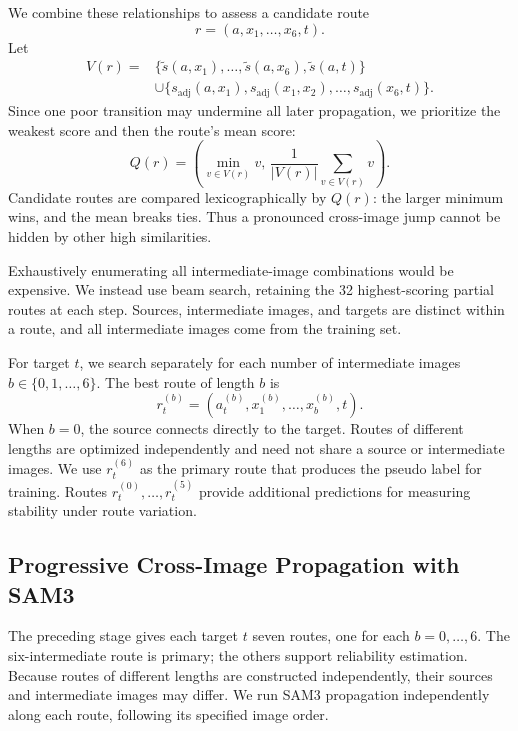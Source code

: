 \documentclass[a4paper,fleqn]{cas-dc}
\begin{document}
We combine these relationships to assess a candidate route
\begin{equation}
r=(a,x_1,\ldots,x_6,t).
\end{equation}
Let
\begin{equation}
\begin{aligned}
V(r)=&\{\widetilde{s}(a,x_1),\ldots,
\widetilde{s}(a,x_6),\widetilde{s}(a,t)\}\\
&\cup\{s_{\mathrm{adj}}(a,x_1),
s_{\mathrm{adj}}(x_1,x_2),\ldots,
s_{\mathrm{adj}}(x_6,t)\}.
\end{aligned}
\end{equation}
Since one poor transition may undermine all later propagation, we prioritize the weakest score and then the route's mean score:
\begin{equation}
Q(r)=\left(
\min_{v\in V(r)}v,\,
\frac{1}{|V(r)|}\sum_{v\in V(r)}v
\right).
\end{equation}
Candidate routes are compared lexicographically by $Q(r)$: the larger minimum wins, and the mean breaks ties. Thus a pronounced cross-image jump cannot be hidden by other high similarities.

Exhaustively enumerating all intermediate-image combinations would be expensive. We instead use beam search, retaining the 32 highest-scoring partial routes at each step. Sources, intermediate images, and targets are distinct within a route, and all intermediate images come from the training set.

For target $t$, we search separately for each number of intermediate images $b\in\{0,1,\ldots,6\}$. The best route of length $b$ is
\[
r_t^{(b)}=
\left(a_t^{(b)},x_1^{(b)},\ldots,x_b^{(b)},t\right).
\]
When $b=0$, the source connects directly to the target. Routes of different lengths are optimized independently and need not share a source or intermediate images. We use $r_t^{(6)}$ as the primary route that produces the pseudo label for training. Routes $r_t^{(0)},\ldots,r_t^{(5)}$ provide additional predictions for measuring stability under route variation.

\subsection{Progressive Cross-Image Propagation with SAM3}
\label{sec:sam3-propagation}

The preceding stage gives each target $t$ seven routes, one for each $b=0,\ldots,6$. The six-intermediate route is primary; the others support reliability estimation. Because routes of different lengths are constructed independently, their sources and intermediate images may differ. We run SAM3 propagation independently along each route, following its specified image order.
\end{document}
